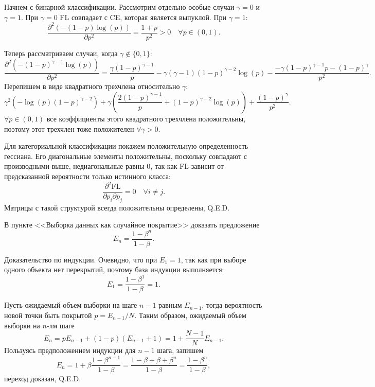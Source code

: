\begin{solution}
    Начнем с бинарной классификации. Рассмотрим отдельно особые случаи $\gamma=0$ и $\gamma=1$. При $\gamma=0$ FL совпадает с CE, которая является выпуклой. При $\gamma=1$:
    \[
        \dfrac{\partial^2\left(-(1-p)\log(p)\right)}{\partial p^2}=\dfrac{1+p}{p^2}>0 \quad \forall p \in (0,1).
    \]
    
    Теперь рассматриваем случаи, когда $\gamma\notin\{0,1\}$:
    \[
        \dfrac{\partial^2\left(-(1-p)^{\gamma-1}\log(p)\right)}{\partial p^2}=\dfrac{\gamma(1-p)^{\gamma-1}}{p}-\gamma(\gamma-1)(1-p)^{\gamma-2}\log(p)-\dfrac{-\gamma(1-p)^{\gamma-1}p-(1-p)^\gamma}{p^2}.
    \]
    Перепишем в виде квадратного трехчлена относительно $\gamma$:
    \[
        \gamma^2\left(-\log(p)(1-p)^{\gamma-2}\right)+\gamma\left(\dfrac{2(1-p)^{\gamma-1}}{p}+(1-p)^{\gamma-2}\log(p)\right)+\dfrac{(1-p)^\gamma}{p^2}.
    \]
    $\forall p \in (0,1)$ все коэффициенты этого квадратного трехчлена положительны, поэтому этот трехчлен тоже положителен $\forall \gamma>0$.

    Для категориальной классификации покажем положительную определенность гессиана. Его диагональные элементы положительны, поскольку совпадают с производными выше, недиагональные равны 0, так как FL зависит от предсказанной вероятности только истинного класса:
    \[
        \dfrac{\partial^2\text{FL}}{\partial p_i \partial p_j}=0 \quad \forall i \neq j.
    \]
    Матрицы с такой структурой всегда положительны определены, Q.E.D.
\end{solution}

\begin{problem}
    В пункте <<Выборка данных как случайное покрытие>>  доказать предложение
    \[
        E_n=\dfrac{1-\beta^n}{1-\beta}.
    \]
\end{problem}

\begin{solution}
    Доказательство по индукции. Очевидно, что при $E_1=1$, так как при выборе одного объекта нет перекрытий, поэтому база индукции выполняется:
    \[
        E_1=\dfrac{1-\beta^1}{1-\beta}=1.
    \]

    Пусть ожидаемый объем выборки на шаге $n-1$ равным $E_{n-1}$, тогда вероятность новой точки быть покрытой $p=E_{n-1}/N$. Таким образом, ожидаемый объем выборки на $n$-лм шаге
    \[
        E_n=pE_{n-1}+(1-p)(E_{n-1}+1)=1+\dfrac{N-1}{N}E_{n-1}.
    \]
    Пользуясь предположением индукции для $n-1$ шага, запишем
    \[
        E_n=1+\beta\dfrac{1-\beta^{n-1}}{1-\beta}=\dfrac{1-\beta+\beta+\beta^{n}}{1-\beta}=\dfrac{1-\beta^{n}}{1-\beta},
    \]
    переход доказан, Q.E.D.
\end{solution}

